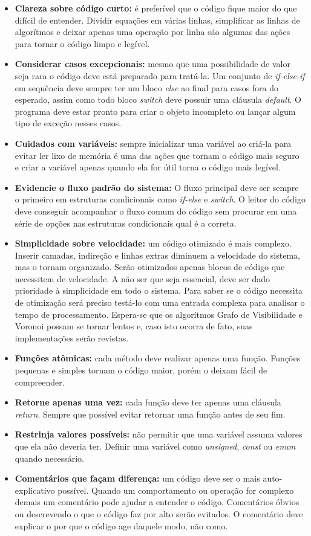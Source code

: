 \begin{itemize}
  \item \textbf{Clareza sobre código curto:} é preferível que o código fique maior do que difícil de entender. Dividir equações em várias linhas, simplificar as linhas de algorítmos e deixar apenas uma operação por linha são algumas das ações para tornar o código limpo e legível.
  \item \textbf{Considerar casos excepcionais:} mesmo que uma possibilidade de valor seja rara o código deve está preparado para tratá-la. Um conjunto de \textit{if-else-if} em sequência deve sempre ter um bloco \textit{else} ao final para casos fora do esperado, assim como todo bloco \textit{switch} deve possuir uma cláusula \textit{default}. O programa deve estar pronto para criar o objeto incompleto ou lançar algum tipo de exceção nesses casos.
  \item \textbf{Cuidados com variáveis:} sempre inicializar uma variável ao criá-la para evitar ler lixo de memória é uma das ações que tornam o código mais seguro e criar a variável apenas quando ela for útil torna o código mais legível.
  \item \textbf{Evidencie o fluxo padrão do sistema:} O fluxo principal deve ser sempre o primeiro em estruturas condicionais como \textit{if-else} e \textit{switch}. O leitor do código deve conseguir acompanhar o fluxo comum do código sem procurar em uma série de opções nas estruturas condicionais qual é a correta.
  \item \textbf{Simplicidade sobre velocidade:} um código otimizado é mais complexo. Inserir camadas, indireção e linhas extras diminuem a velocidade do sistema, mas o tornam organizado. Serão otimizados apenas blocos de código que necessitem de velocidade. A não ser que seja essencial, deve ser dado prioridade à simplicidade em todo o sistema. Para saber se o código necessita de otimização será preciso testá-lo com uma entrada complexa para analisar o tempo de processamento. Espera-se que os algorítmos Grafo de Visibilidade e Voronoi possam se tornar lentos e, caso isto ocorra de fato, suas implementações serão revistas.
  \item \textbf{Funções atômicas:} cada método deve realizar apenas uma função. Funções pequenas e simples tornam o código maior, porém o deixam fácil de compreender.
  \item \textbf{Retorne apenas uma vez:} cada função deve ter apenas uma cláusula \textit{return}. Sempre que possível evitar retornar uma função antes de seu fim.
  \item \textbf{Restrinja valores possíveis:} não permitir que uma variável assuma valores que ela não deveria ter. Definir uma variável como \textit{unsigned}, \textit{const} ou \textit{enum} quando necessário.
  \item \textbf{Comentários que façam diferença:} um código deve ser o mais auto-explicativo possível. Quando um comportamento ou operação for complexo demais um comentário pode ajudar a entender o código. Comentários óbvios ou descrevendo o que o código faz por alto serão evitados. O comentário deve explicar o por que o código age daquele modo, não como.
\end{itemize} 

